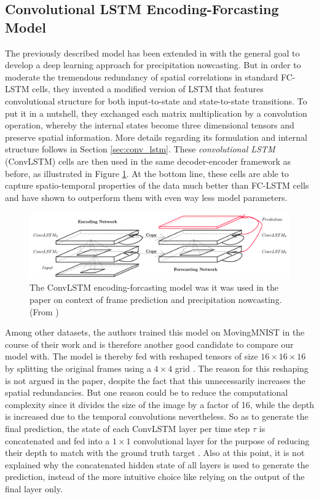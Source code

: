\subsection{Convolutional LSTM Encoding-Forcasting Model}

The previously described model has been extended in \parencite{conv_lstm_nowcasting} with the general goal to develop a deep learning approach for precipitation nowcasting. But in order to moderate the tremendous redundancy of spatial correlations in standard FC-LSTM cells, they invented a modified version of LSTM that features convolutional structure for both input-to-state and state-to-state transitions. To put it in a nutshell, they exchanged each matrix multiplication by a convolution operation, whereby the internal states become three dimensional tensors and preserve spatial information. More details regarding its formulation and internal structure follows in Section \ref{sec:conv_lstm}. These \textit{convolutional LSTM} (ConvLSTM) cells are then used in the same decoder-encoder framework as before, as illustrated in Figure \ref{fig:convlstm_model}. At the bottom line, these cells are able to capture spatio-temporal properties of the data much better than FC-LSTM cells and have shown to outperform them with even way less model parameters.

\begin{figure}[htb]
	\centering
	\includegraphics[width=0.8\linewidth]{figures/related/nowcasting_model.png} 
	\caption[ConvLSTM Encoding-Forecasting Model]{The ConvLSTM encoding-forcasting model was it was used in the paper on context of frame prediction and precipitation nowcasting. (From \parencite{conv_lstm_nowcasting})} \label{fig:convlstm_model}
\end{figure}

Among other datasets, the authors trained this model on MovingMNIST in the course of their work and is therefore another good candidate to compare our model with. The model is thereby fed with reshaped tensors of size $16 \times 16 \times 16$ by splitting the original frames using a $4 \times 4$ grid \parencite[p. 6]{conv_lstm_nowcasting}. The reason for this reshaping is not argued in the paper, despite the fact that this unnecessarily increases the spatial redundancies. But one reason could be to reduce the computational complexity since it divides the size of the image by a factor of 16, while the depth is increased due to the temporal convolutions nevertheless. So as to generate the final prediction, the state of each ConvLSTM layer per time step $\tau$ is concatenated and fed into a $1 \times 1$ convolutional layer for the purpose of reducing their depth to match with the ground truth target \parencite[p. 4]{conv_lstm_nowcasting}. Also at this point, it is not explained why the concatenated hidden state of all layers is used to generate the prediction, instead of the more intuitive choice like relying on the output of the final layer only.

